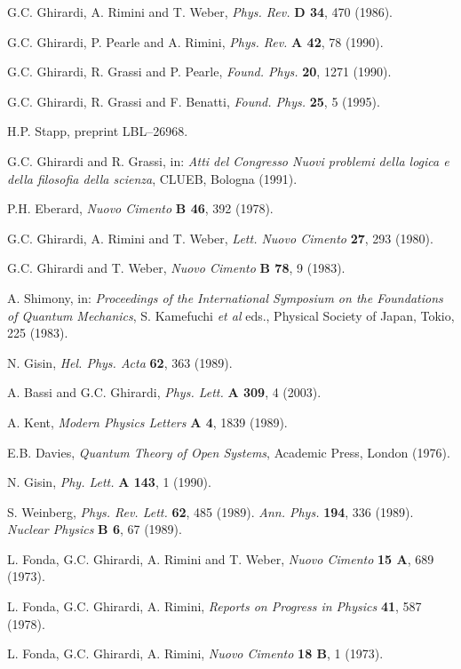 \documentclass[10pt,a4paper]{article}
\begin{document}
\begin{thebibliography}{999}
 G.C. Ghirardi, A. Rimini and T. Weber, {\it Phys.
Rev.} {\bf D 34}, 470 (1986).

 G.C. Ghirardi, P. Pearle and A. Rimini, {\it Phys.
Rev.} {\bf A 42}, 78 (1990).

 G.C. Ghirardi, R. Grassi and P. Pearle, {\it Found.
Phys.} {\bf 20}, 1271 (1990).

 G.C. Ghirardi, R. Grassi and F. Benatti, {\it Found.
Phys.} {\bf 25}, 5 (1995).

 H.P. Stapp, preprint LBL--26968.

 G.C. Ghirardi and R. Grassi, in: {\it Atti del
Congresso Nuovi problemi della logica e della filosofia della
scienza}, CLUEB, Bologna (1991).

 P.H. Eberard, {\it Nuovo Cimento} {\bf B 46}, 392
(1978).

 G.C. Ghirardi, A. Rimini and T. Weber, {\it Lett.
Nuovo Cimento} {\bf 27}, 293 (1980).

 G.C. Ghirardi and T. Weber, {\it Nuovo Cimento}
{\bf B 78}, 9 (1983).

 A. Shimony, in: {\it Proceedings of the
International Symposium on the Foundations of Quantum Mechanics},
S. Kamefuchi {\it et al} eds., Physical Society of Japan, Tokio,
225 (1983).

 N. Gisin, {\it Hel. Phys. Acta} {\bf 62}, 363
(1989).

 A. Bassi and G.C. Ghirardi, {\it Phys. Lett.} {\bf
A 309}, 4 (2003).

 A. Kent, {\it Modern Physics Letters} {\bf A 4},
1839 (1989).

 E.B. Davies, {\it Quantum Theory of Open Systems},
Academic Press, London (1976).

 N. Gisin, {\it Phy. Lett.} {\bf A 143}, 1 (1990).

 S. Weinberg, {\it Phys. Rev. Lett.} {\bf 62}, 485
(1989). {\it Ann. Phys.} {\bf 194}, 336 (1989). {\it Nuclear
Physics} {\bf B 6}, 67 (1989).

 L. Fonda, G.C. Ghirardi, A. Rimini and T. Weber,
{\it Nuovo Cimento} {\bf 15 A}, 689 (1973).

 L. Fonda, G.C. Ghirardi, A. Rimini, {\it Reports
on Progress in Physics} {\bf 41}, 587 (1978).

 L. Fonda, G.C. Ghirardi, A. Rimini, {\it Nuovo
Cimento} {\bf 18 B}, 1 (1973).


\end{thebibliography}
\end{document}
